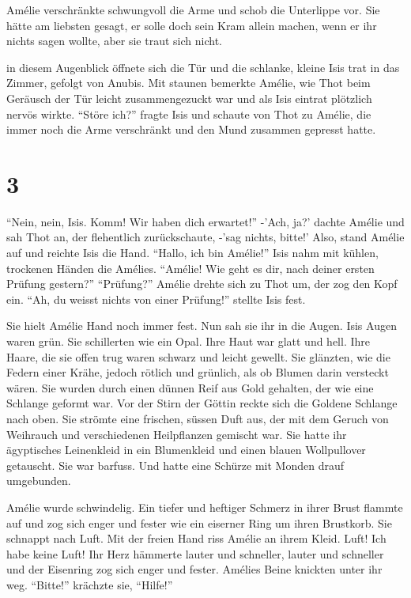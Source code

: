 \documentclass[11pt,titlepage,a5paper]{book}
\begin{document}
Amélie verschränkte schwungvoll die Arme und schob die Unterlippe vor. Sie hätte am liebsten gesagt, er solle doch sein Kram allein machen, wenn er ihr nichts sagen wollte, aber sie traut sich nicht.

in diesem Augenblick öffnete sich die Tür und die schlanke, kleine Isis trat in das Zimmer, gefolgt von Anubis. Mit staunen bemerkte Amélie, wie Thot beim Geräusch der Tür leicht zusammengezuckt war und als Isis eintrat plötzlich nervös wirkte. "`Störe ich?"' fragte Isis und schaute von Thot zu Amélie, die immer noch die Arme verschränkt und den Mund zusammen gepresst hatte.

\section*{3}
 
"`Nein, nein, Isis. Komm! Wir haben dich erwartet!"' -'Ach, ja?' dachte Amélie und sah Thot an, der flehentlich zurückschaute, -'sag nichts, bitte!' Also, stand Amélie auf und reichte Isis die Hand. "`Hallo, ich bin Amélie!"' Isis nahm mit kühlen, trockenen Händen die Amélies. "`Amélie! Wie geht es dir, nach deiner ersten Prüfung gestern?"' "`Prüfung?"' Amélie drehte sich zu Thot um, der zog den Kopf ein. "`Ah, du weisst nichts von einer Prüfung!"' stellte Isis fest. 

Sie hielt Amélie Hand noch immer fest. Nun sah sie ihr in die Augen. Isis Augen waren grün. Sie schillerten wie ein Opal. Ihre Haut war glatt und hell. Ihre Haare, die sie offen trug waren schwarz und leicht gewellt. Sie glänzten, wie die Federn einer Krähe, jedoch rötlich und grünlich, als ob Blumen darin versteckt wären. Sie wurden durch einen dünnen Reif aus Gold gehalten, der wie eine Schlange geformt war. Vor der Stirn der Göttin reckte sich die Goldene Schlange nach oben. Sie strömte eine frischen, süssen Duft aus, der mit dem Geruch von Weihrauch und verschiedenen Heilpflanzen gemischt war. Sie hatte ihr ägyptisches Leinenkleid in ein Blumenkleid und einen blauen Wollpullover getauscht. Sie war barfuss. Und hatte eine Schürze mit Monden drauf umgebunden.

Amélie wurde schwindelig. Ein tiefer und heftiger Schmerz in ihrer Brust flammte auf und zog sich enger und fester wie ein eiserner Ring um ihren Brustkorb. Sie schnappt nach Luft. Mit der freien Hand riss Amélie an ihrem Kleid. Luft! Ich habe keine Luft! Ihr Herz hämmerte lauter und schneller, lauter und schneller und der Eisenring zog sich enger und fester. Amélies Beine knickten unter ihr weg. "`Bitte!"' krächzte sie, "`Hilfe!"' 
\end{document}
